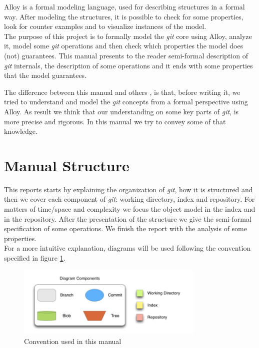 Alloy \cite{Jackson:2006:SAL:1146359} is a formal modeling language, used for describing structures in 
a formal way. After modeling the structures, it is possible to
check for some properties, look for counter examples and to visualize 
instances of the model. \\

The purpose of this project is to
formally model the \emph{git} core using Alloy, analyze it, model some \emph{git}
operations and then check which properties the model does (not)
guarantees. This manual presents to the reader semi-formal description of
\emph{git} internals, the description of some operations and it ends with
some properties that the model guarantees.

The difference between this manual and others \cite{gitComm,progit}, is
that, before writing it, we tried to understand and model 
the \emph{git} concepts from a formal perspective using Alloy. As result 
we think that our understanding on some key parts of \emph{git}, is more precise
and rigorous. In this manual we try to convey some of that knowledge.

\section{Manual Structure}
This reports starts by explaining the organization of \emph{git}, how
it is structured and then we cover each component of \emph{git}:
working directory, index and repository. For matters
of time/space and complexity we focus the object model in the index and in the
repository. After the presentation of the structure we give the semi-formal
specification of some operations. We finish the report with the
analysis of some properties. \\

For a more intuitive explanation, diagrams will be used following
the convention specified in figure \ref{fig:notation}. 

\begin{figure}[tp]
   \centering
   \includegraphics[width=0.8\textwidth]{images/Legenda.png}
   \caption{Convention used in this manual}
   \label{fig:notation}
\end{figure}

